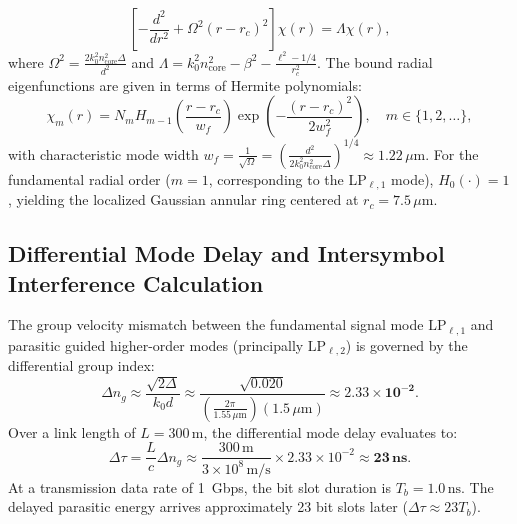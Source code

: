 \documentclass{optica-article}
\begin{document}
\begin{equation}
\left[ - \frac{d^2}{dr^2} + \Omega^2 (r - r_c)^2 \right] \chi(r) = \Lambda \chi(r),
\label{eq:app_harmonic_oscillator}
\end{equation}
where $\Omega^2 = \frac{2 k_0^2 n_{\text{core}}^2 \Delta}{d^2}$ and $\Lambda = k_0^2 n_{\text{core}}^2 - \beta^2 - \frac{\ell^2 - 1/4}{r_c^2}$. The bound radial eigenfunctions are given in terms of Hermite polynomials:
\begin{equation}
\chi_m(r) = N_m H_{m-1}\left( \frac{r - r_c}{w_f} \right) \exp\left( - \frac{(r - r_c)^2}{2 w_f^2} \right), \quad m \in \{1, 2, \dots\},
\label{eq:app_hermite_modes}
\end{equation}
with characteristic mode width $w_f = \frac{1}{\sqrt{\Omega}} = (\frac{d^2}{2 k_0^2 n_{\text{core}}^2 \Delta})^{1/4} \approx 1.22\,\mu\text{m}$. For the fundamental radial order ($m=1$, corresponding to the LP$_{\ell, 1}$ mode), $H_0(\cdot) = 1$, yielding the localized Gaussian annular ring centered at $r_c = 7.5\,\mu\text{m}$.

\subsection{Differential Mode Delay and Intersymbol Interference Calculation}

The group velocity mismatch between the fundamental signal mode $\text{LP}_{\ell, 1}$ and parasitic guided higher-order modes (principally $\text{LP}_{\ell, 2}$) is governed by the differential group index:
\begin{equation}
\Delta n_g \approx \frac{\sqrt{2\Delta}}{k_0 d} \approx \frac{\sqrt{0.020}}{\left( \frac{2\pi}{1.55\,\mu\text{m}} \right) (1.5\,\mu\text{m})} \approx \mathbf{2.33 \times 10^{-2}}.
\label{eq:app_delta_ng_eval}
\end{equation}
Over a link length of $L = 300\,\text{m}$, the differential mode delay evaluates to:
\begin{equation}
\Delta \tau = \frac{L}{c} \Delta n_g \approx \frac{300\,\text{m}}{3 \times 10^8\,\text{m/s}} \times 2.33 \times 10^{-2} \approx \mathbf{23\,\text{ns}}.
\label{eq:app_dmd_result}
\end{equation}
At a transmission data rate of 1~Gbps, the bit slot duration is $T_b = 1.0\,\text{ns}$. The delayed parasitic energy arrives approximately 23 bit slots later ($\Delta \tau \approx 23 T_b$).
\end{document}
